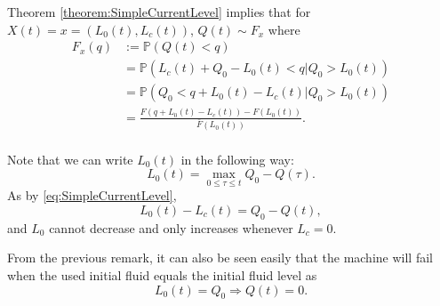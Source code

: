 \begin{corollary}\label{corollary:SimpleFluidDistribution}
	Theorem \ref{theorem:SimpleCurrentLevel} implies that for $X(t)=x=(L_0(t),L_c(t))$, $Q(t)\sim F_x$ where
	\begin{equation}\label{eq:SimpleCurrentDistribution}
	\begin{split}
	F_x(q)&:=\mathbb{P}(Q(t)<q)\\
	&=\mathbb{P}(L_c(t)+Q_0-L_0(t)<q|Q_0>L_0(t))\\
	&=\mathbb{P}(Q_0<q+L_0(t)-L_c(t)|Q_0>L_0(t))\\
	&=\frac{F(q+L_0(t)-L_c(t))-F(L_0(t))}{\bar{F}(L_0(t))}.\\
	\end{split}
	\end{equation}
\end{corollary}
\begin{remark}
	Note that we can write $L_0(t)$ in the following way:
	\[
	L_0(t)=\max\limits_{0\leq\tau\leq t} Q_0-Q(\tau).
	\]
	As by \eqref{eq:SimpleCurrentLevel}, 
	\[
	L_0(t)-L_c(t)=Q_0-Q(t),
	\]
	and $L_0$ cannot decrease and only increases whenever $L_c=0$.
\end{remark}
\begin{corollary}
	From the previous remark, it can also be seen easily that the machine will fail when the used initial fluid equals the initial fluid level as
	\[
	L_0(t)=Q_0\Rightarrow Q(t)=0.
	\]
\end{corollary}

